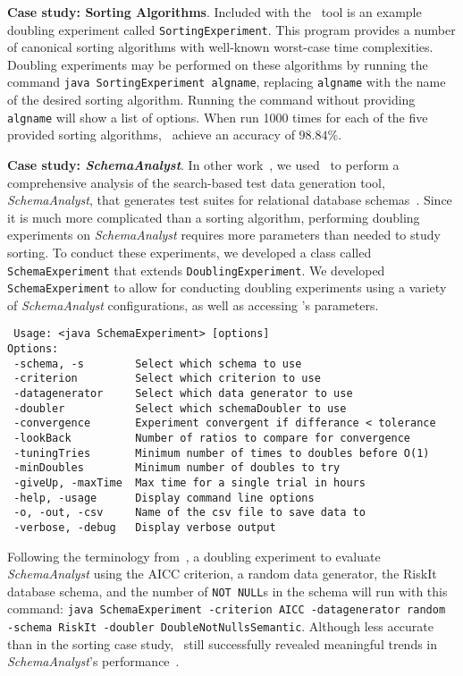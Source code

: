     \lstset{language=bash}

    {\bf Case study: Sorting Algorithms}.  Included with the
    \toolname~tool is an example doubling experiment called
    \texttt{SortingExperiment}.  This program provides a number of
    canonical sorting algorithms with well-known worst-case time
    complexities.  Doubling experiments may be performed on these
    algorithms by running the command \texttt{java SortingExperiment
    algname}, replacing \texttt{algname} with the name of the desired
    sorting algorithm. Running the command without providing
    \texttt{algname} will show a list of options. When run 1000 times
    for each of the five provided sorting algorithms, \toolname~achieve
    an accuracy of $98.84\%$.

    {\bf Case study: \textit{SchemaAnalyst}}. In other
    work~\cite{kinneer2015}, we used \toolname~to perform a
    comprehensive analysis of the search-based test data generation
    tool, \textit{SchemaAnalyst}, that generates test suites for
    relational database schemas~\cite{kapfhammer2013}. Since it is much
    more complicated than a sorting algorithm, performing doubling
    experiments on \textit{SchemaAnalyst} requires more parameters than
    needed to study sorting.  To conduct these experiments, we developed
    a class called \texttt{SchemaExperiment} that extends
    \texttt{DoublingExperiment}.  We developed \texttt{SchemaExperiment}
    to allow for conducting doubling experiments using a variety of
    \textit{SchemaAnalyst} configurations, as well as accessing
    \toolname's parameters.

    \vspace*{-.075in}

{\scriptsize
\begin{verbatim}
 Usage: <java SchemaExperiment> [options]
Options:
 -schema, -s        Select which schema to use
 -criterion         Select which criterion to use
 -datagenerator     Select which data generator to use
 -doubler           Select which schemaDoubler to use
 -convergence       Experiment convergent if differance < tolerance
 -lookBack          Number of ratios to compare for convergence
 -tuningTries       Minimum number of times to doubles before O(1)
 -minDoubles        Minimum number of doubles to try
 -giveUp, -maxTime  Max time for a single trial in hours
 -help, -usage      Display command line options
 -o, -out, -csv     Name of the csv file to save data to
 -verbose, -debug   Display verbose output
\end{verbatim}
}

\vspace*{-.075in}

Following the terminology from~\cite{kempka2015}, a doubling experiment
to evaluate \textit{SchemaAnalyst} using the AICC criterion, a random
data generator, the RiskIt database schema, and the number of
\texttt{NOT NULL}s in the schema will run with this command:
\texttt{java SchemaExperiment -criterion AICC -datagenerator random
-schema RiskIt -doubler DoubleNotNullsSemantic}.  Although less accurate
than in the sorting case study, \toolname~still successfully revealed
meaningful trends in \textit{SchemaAnalyst}'s
performance~\cite{kinneer2015}.


